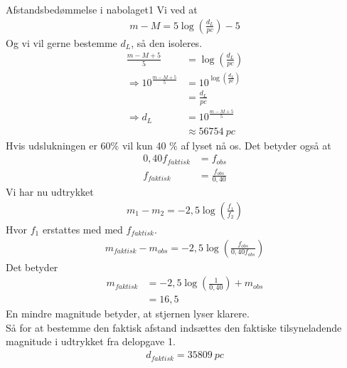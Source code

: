 \begin{opgave}{Afstandsbedømmelse i nabolaget}{1}
	\opg Vi ved at
	\begin{align*}
	m-M = 5\log \left( \frac{d_L}{\si{pc}} \right) -5
	\end{align*}
	Og vi vil gerne bestemme $d_L$, så den isoleres. 
	\begin{align*}
	\frac{m-M+5}{5} &= \log \left( \frac{d_L}{\si{pc}} \right) \\
	\Rightarrow 10^{\frac{m-M+5}{5}} &= 10^{\log \left( \frac{d_L}{\si{pc}} \right)}\\
	&= \frac{d_L}{\si{pc}}\\
	\Rightarrow d_L &= 10^{\frac{m-M+5}{5}}\\
	& \approx 56754~\si{pc}
	\end{align*}
	\opg Hvis udslukningen er 60$\%$ vil kun 40 $\%$ af lyset nå os. Det betyder også at 
	\begin{align*}
	0,40f_{faktisk} &= f_{obs}\\
	f_{faktisk} &= \frac{f_{obs}}{0,40}
	\end{align*}
	Vi har nu udtrykket 
	\begin{align*}
	m_1-m_2 = -2,5 \log \left( \frac{f_1}{f_2} \right) 
	\end{align*}	 
	Hvor $f_1$ erstattes med med $f_{faktisk}$. 
	\begin{align*}
	m_{faktisk}-m_{obs} = -2,5 \log \left( \frac{f_{obs}}{0,40f_{obs}} \right) 
	\end{align*}
	Det betyder
	\begin{align*}
	m_{faktisk} &=-2,5\log \left( \frac{1}{0,40} \right) +m_{obs} \\
	&= 16,5
	\end{align*}
	En mindre magnitude betyder, at stjernen lyser klarere. \\
	Så for at bestemme den faktisk afstand indsættes den faktiske tilsyneladende magnitude i udtrykket fra delopgave 1. 
	\begin{align*}
	d_{faktisk} = 35809~\si{pc}
	\end{align*}
\end{opgave} 
